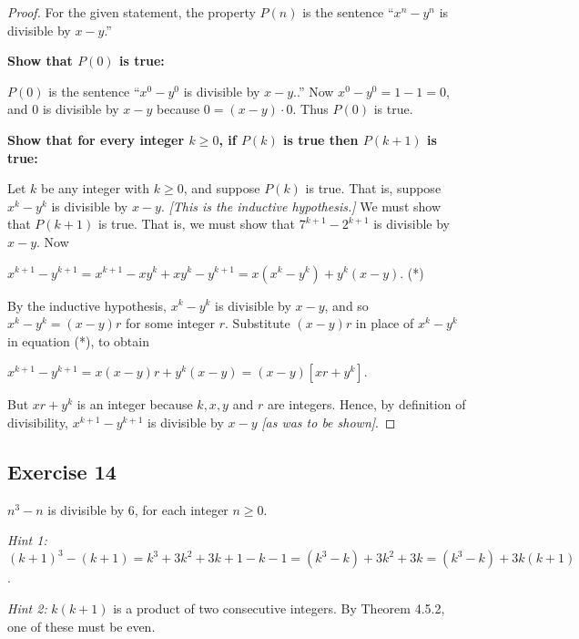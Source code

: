 \documentclass[14pt]{extarticle}
\begin{document}
\begin{proof}
    For the given statement, the property $P(n)$ is the sentence “$x^n - y^n$ is divisible by $x - y$.”

    {\bf Show that $P(0)$ is true:}

    $P(0)$ is the sentence “$x^0 - y^0$ is divisible by $x - y$..” Now $x^0 - y^0 = 1 - 1 = 0$, and 0 is divisible by $x - y$ because $0 = (x-y) \cdot 0$. Thus $P(0)$ is true.

        {\bf Show that for every integer $k \geq 0$, if $P(k)$ is true then $P(k + 1)$ is true:}

    Let $k$ be any integer with $k \geq 0$, and suppose $P(k)$ is true. That is, suppose $x^k - y^k$ is divisible by $x-y$. {\it [This is the inductive hypothesis.]} We must show that $P(k + 1)$ is true. That is, we must show that $7^{k+1} - 2^{k+1}$ is divisible by $x-y$. Now

    $x^{k+1} - y^{k+1} = x^{k+1} - xy^k + xy^k - y^{k+1} = x(x^k - y^k) + y^k(x-y)$. (*)

    By the inductive hypothesis, $x^k - y^k$ is divisible by $x-y$, and so $x^k - y^k = (x-y)r$ for some integer $r$. Substitute $(x-y)r$ in place of $x^k - y^k$ in equation (*), to obtain

    $x^{k+1} - y^{k+1} = x(x - y)r + y^k(x-y) = (x-y)[xr + y^k]$.

    But $xr + y^k$ is an integer because $k, x, y$ and $r$ are integers. Hence, by definition of divisibility, $x^{k+1} - y^{k+1}$ is divisible by $x - y$ {\it [as was to be shown]}.
\end{proof}

\subsection{Exercise 14}
$n^3 - n$ is divisible by 6, for each integer $n \geq 0$.

    {\it Hint 1:} $(k + 1)^3 - (k + 1) = k^3 + 3k^2 + 3k + 1 - k - 1 = (k^3 - k) + 3k^2 + 3k = (k^3 - k) + 3k(k + 1)$.

    {\it Hint 2:} $k(k + 1)$ is a product of two consecutive integers. By Theorem 4.5.2, one of these must be even.
\end{document}
